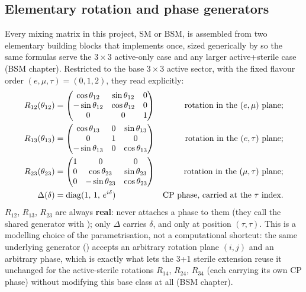 \begin{theorybox}
\subsection*{Elementary rotation and phase generators}
Every mixing matrix in this project, SM or BSM, is assembled from two
elementary building blocks that  implements once, sized
generically by  so the same formulas serve the
$3\times3$ active-only case and any larger active+sterile case (BSM
chapter). Restricted to the base $3\times3$ active sector, with the fixed
flavour order $(e,\mu,\tau)=(0,1,2)$, they read explicitly:
\begin{align}
  R_{12}(\theta_{12}) &=
    \begin{pmatrix}
      \cos\theta_{12} & \sin\theta_{12} & 0 \\
      -\sin\theta_{12} & \cos\theta_{12} & 0 \\
      0 & 0 & 1
    \end{pmatrix}
  & \text{rotation in the $(e,\mu)$ plane;}
  \\
  R_{13}(\theta_{13}) &=
    \begin{pmatrix}
      \cos\theta_{13} & 0 & \sin\theta_{13} \\
      0 & 1 & 0 \\
      -\sin\theta_{13} & 0 & \cos\theta_{13}
    \end{pmatrix}
  & \text{rotation in the $(e,\tau)$ plane;}
  \\
  R_{23}(\theta_{23}) &=
    \begin{pmatrix}
      1 & 0 & 0 \\
      0 & \cos\theta_{23} & \sin\theta_{23} \\
      0 & -\sin\theta_{23} & \cos\theta_{23}
    \end{pmatrix}
  & \text{rotation in the $(\mu,\tau)$ plane;}
  \\
  \Delta(\delta) &= \operatorname{diag}(1,\,1,\,e^{i\delta})
  & \text{CP phase, carried at the $\tau$ index.}
\end{align}
$R_{12}$, $R_{13}$, $R_{23}$ are always \textbf{real}:  never
attaches a phase to them (they call the shared generator with
); only $\Delta$ carries $\delta$, and only at position
$(\tau,\tau)$. This is a modelling choice of the parametrisation, not a
computational shortcut: the same underlying generator ()
accepts an arbitrary rotation plane $(i,j)$ and an arbitrary phase, which is
exactly what lets the 3+1 sterile extension reuse it unchanged for the
active-sterile rotations $R_{14}$, $R_{24}$, $R_{34}$ (each carrying its own
CP phase) without modifying this base class at all (BSM chapter). 


\end{theorybox}
